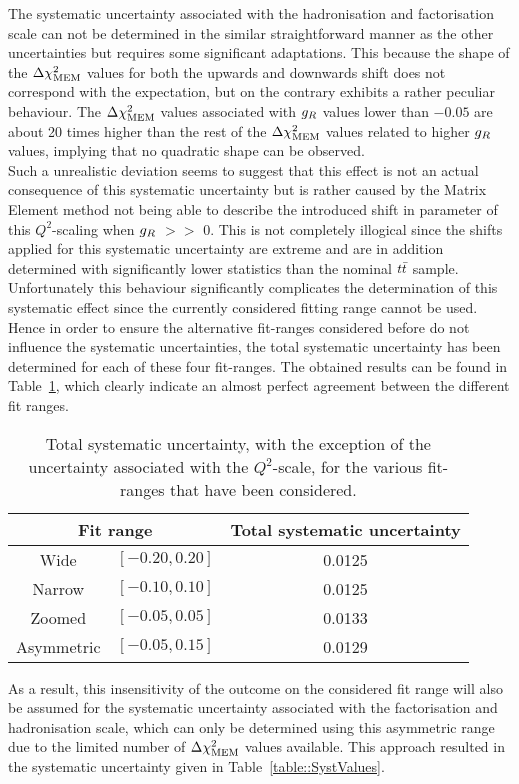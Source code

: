 \begin{myindentpar}
\begin{description}
    The systematic uncertainty associated with the hadronisation and factorisation scale can not be determined in the similar straightforward manner as the other uncertainties but requires some significant adaptations. 
    This because the shape of the $\Delta \chi^{2}_{\textrm{MEM}}$ values for both the upwards and downwards shift does not correspond with the expectation, but on the contrary exhibits a rather peculiar behaviour.
    The $\Delta \chi^{2}_{\textrm{MEM}}$ values associated with $g_{R}$ values lower than $-0.05$ are about 20 times higher than the rest of the $\Delta \chi^{2}_{\textrm{MEM}}$ values related to higher $g_{R}$ values, implying that no quadratic shape can be observed.
    \\
    Such a unrealistic deviation seems to suggest that this effect is not an actual consequence of this systematic uncertainty but is rather caused by the Matrix Element method not being able to describe the introduced shift in parameter of this $Q^{2}$-scaling when $g_{R}$ $>>$ 0.
    This is not completely illogical since the shifts applied for this systematic uncertainty are extreme and are in addition determined with significantly lower statistics than the nominal $t\bar{t}$ sample.    
    \\
    
    Unfortunately this behaviour significantly complicates the determination of this systematic effect since the currently considered fitting range cannot be used.
    Hence in order to ensure the alternative fit-ranges considered before do not influence the systematic uncertainties, the total systematic uncertainty has been determined for each of these four fit-ranges.
    The obtained results can be found in Table~\ref{table::FitRangesSyst}, which clearly indicate an almost perfect agreement between the different fit ranges.
    \begin{table}[h!t]
     \caption{Total systematic uncertainty, with the exception of the uncertainty associated with the $Q^{2}$-scale, for the various fit-ranges that have been considered.} \label{table::FitRangesSyst}
     \centering
     \begin{tabular}{cc|c}
      \multicolumn{2}{c|}{Fit range}				& Total systematic uncertainty 	\\
      \hline
      Wide 		& $\left[ -0.20, 0.20 \right]$ 		& 0.0125			\\
      Narrow 		& $\left[ -0.10, 0.10 \right]$ 		& 0.0125 			\\
      Zoomed 		& $\left[ -0.05, 0.05 \right]$ 		& 0.0133 			\\
      Asymmetric 	& $\left[ -0.05, 0.15 \right]$ 		& 0.0129 	
     \end{tabular}
    \end{table}
    As a result, this insensitivity of the outcome on the considered fit range will also be assumed for the systematic uncertainty associated with the factorisation and hadronisation scale, which can only be determined using this asymmetric range due to the limited number of $\Delta \chi^{2}_{\textrm{MEM}}$ values available. This approach resulted in the systematic uncertainty given in Table~\ref{table::SystValues}.
    

\end{description}
\end{myindentpar}
